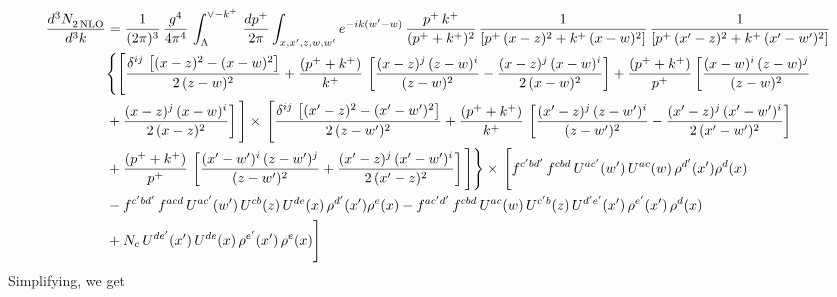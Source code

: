 \documentclass[9pt]{article}
\numberwithin{equation}{section}
\begin{document}
\begin{align}
    \frac{d^{3}N_{2\,\rm NLO}^{\rm}}{d^{3}k}  & = \frac{1}{(2\pi)^{3}}\, \frac{g^{4}}{4\pi^{4}}\,\int_{\Lambda}^{\vee-k^{+}}\, \frac{dp^{+}}{2\pi}\int_{x,x',z,w,w^{\prime}} e^{-ik(w^{\prime}-w)}\,\frac{p^{+}\,k^{+}}{(p^{+}+k^{+})^{2}}\, \frac{1}{\left[p^{+}\,(x-z)^{2}+k^{+}\,(x-w)^{2}\right]}\,\frac{1}{\left[p^{+}\,(x'-z)^{2}+k^{+}\,(x'-w')^{2}\right]}\notag \\ & \Bigg\{\Bigg[\frac{\delta^{ij}\, \left[(x-z)^{2}-(x-w)^{2}\right]}{2\,(z-w)^{2}} + \frac{(p^{+}+k^{+})}{k^{+}}\, \left[\frac{(x-z)^{j}\,(z-w)^{i}}{(z-w)^{2}}-\frac{(x-z)^{j}\,(x-w)^{i}}{2\,(x-w)^{2}}\right]+\frac{(p^{+}+k^{+})}{p^{+}}\,\bigg[\frac{(x-w)^{i}\,(z-w)^{j}}{(z-w)^{2}}\notag \\ & +\frac{(x-z)^{j}\,(x-w)^{i}}{2\,(x-z)^{2}}\bigg]\,\Bigg]\times\, \Bigg[\frac{\delta^{ij}\, \left[(x'-z)^{2}-(x'-w')^{2}\right]}{2\,(z-w')^{2}}+ \frac{(p^{+}+k^{+})}{k^{+}}\, \left[\frac{(x'-z)^{j}\,(z-w')^{i}}{(z-w')^{2}}-\frac{(x'-z)^{j}\,(x'-w')^{i}}{2\,(x'-w')^{2}}\right]\notag \\ & +\frac{(p^{+}+k^{+})}{p^{+}}\,\left[\frac{(x'-w')^{i}\,(z-w')^{j}}{(z-w')^{2}} +\frac{(x'-z)^{j}\,(x'-w')^{i}}{2\,(x'-z)^{2}}\right] \Bigg] \Bigg\} \times\,  \Bigg[f^{c'bd'}\,f^{cbd}\, U^{ac'}(w')\,U^{ac}(w)\,\rho^{d'}(x')\rho^{d}(x)\notag \\ & - f^{c'bd'}\,f^{acd}\,U^{ac'}(w')\,U^{cb}(z)\,U^{de}(x)\,\rho^{d'}(x')\rho^{e}(x) -f^{ac'd'}\,f^{cbd}\,U^{ac}(w)\,U^{c'b}(z)\,U^{d'e'}(x')\,\rho^{e'}(x')\,\rho^{d}(x)\notag \\ & +N_{c}\,U^{de'}(x')\,U^{de}(x)\,\rho^{e'}(x')\,\rho^{e}(x)\Bigg]
\end{align}
Simplifying, we get
\end{document}
